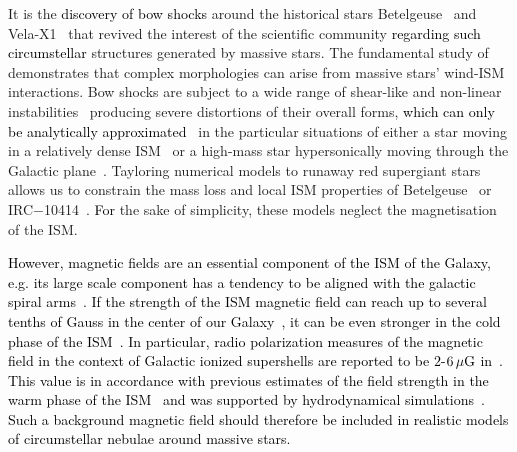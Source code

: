 \documentclass[useAMS,usenatbib]{mn2e}
\begin{document}
It is the \textcolor{black}{discovery of bow shocks} around the historical stars
Betelgeuse~\citep{noriegacrespo_aj_114_1997} and
Vela-X1~\citep{kaper_apj_475_1997} that revived the interest of the scientific
community \textcolor{black}{regarding such circumstellar} structures generated by massive stars. The
fundamental study of~\citet{comeron_aa_338_1998} demonstrates that complex
morphologies can arise from massive stars' wind-ISM interactions. Bow shocks are subject to a 
wide range of shear-like and non-linear instabilities~\citep{blondin_na_57_1998} 
producing severe distortions of their overall forms, \textcolor{black}{which can only be 
analytically approximated}~\citep{wilkin_459_apj_1996} in the particular
situations of either a star moving in a relatively dense 
ISM~\citep{comeron_aa_338_1998} or a high-mass star hypersonically moving 
through the Galactic plane~\citep[][hereafter Paper~I]{meyer_2014b}. Tayloring 
numerical models to runaway red supergiant stars allows us to constrain 
the mass loss and local ISM properties of 
Betelgeuse~\citep{vanmarle_apj_734_2011,cox_aa_537_2012,mackey_apjlett_751_2012} or
IRC$-$10414~\citep{Gvaramadze_2013,meyer_mnras_439_2014}. \textcolor{black}{For} the sake of simplicity, these
models neglect the magnetisation of the ISM.  


\textcolor{black}{
However, magnetic fields are an essential component of the ISM of the Galaxy, 
e.g. its large scale component has a tendency to be aligned with the galactic 
spiral arms~\citep{gaensler_apj_493_1998}. If the strength of the ISM magnetic field 
can reach up to several tenths of Gauss in the center of our 
Galaxy~\citep[see][]{rand_apj_343_1989, 
ohno_mnras_262_1993,opher_natur_462_2009,
shabala_mnras_405_2010}, it can be even stronger in the cold 
phase of the ISM~\citep{crutcher_apj_515_1999}. In particular, radio polarization 
measures of the magnetic field in the context of Galactic ionized supershells are 
reported to be $2$-$6\, \mu \rm G$ in~\citet{harvey_apj_736_2011}. This value is 
in accordance with previous estimates of the field strength in the warm phase of the 
ISM~\citep{troland_301_apj_1986} and was supported by hydrodynamical 
simulations~\citep{fiedler_apj_415_1993}.  
Such a background magnetic field should therefore be included in realistic models of 
circumstellar nebulae around massive stars. 
}
\end{document}
